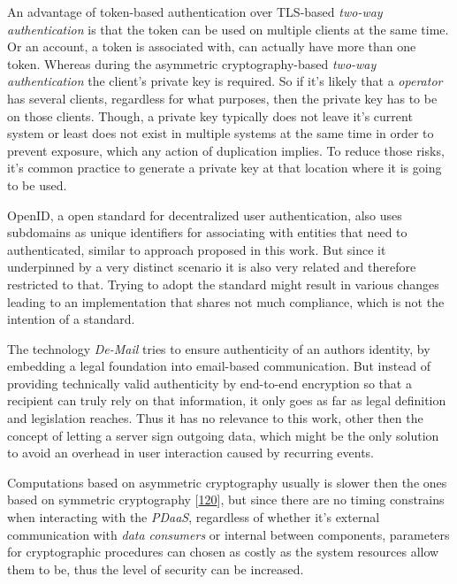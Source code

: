 \documentclass[12pt,english,a4paper,titlepage,cleardoublepage=empty,dottedtoc]{report}
\begin{document}
An advantage of token-based authentication over TLS-based \emph{two-way
authentication} is that the token can be used on multiple clients at the
same time. Or an account, a token is associated with, can actually have
more than one token. Whereas during the asymmetric cryptography-based
\emph{two-way authentication} the client's private key is required. So
if it's likely that a \emph{operator} has several clients, regardless
for what purposes, then the private key has to be on those clients.
Though, a private key typically does not leave it's current system or
least does not exist in multiple systems at the same time in order to
prevent exposure, which any action of duplication implies. To reduce
those risks, it's common practice to generate a private key at that
location where it is going to be used.

OpenID, a open standard for decentralized user authentication, also uses
subdomains as unique identifiers for associating with entities that need
to authenticated, similar to approach proposed in this work. But since
it underpinned by a very distinct scenario it is also very related and
therefore restricted to that. Trying to adopt the standard might result
in various changes leading to an implementation that shares not much
compliance, which is not the intention of a standard.

The technology \emph{De-Mail} tries to ensure authenticity of an authors
identity, by embedding a legal foundation into email-based
communication. But instead of providing technically valid authenticity
by end-to-end encryption so that a recipient can truly rely on that
information, it only goes as far as legal definition and legislation
reaches. Thus it has no relevance to this work, other then the concept
of letting a server sign outgoing data, which might be the only solution
to avoid an overhead in user interaction caused by recurring events.

Computations based on asymmetric cryptography usually is slower then the
ones based on symmetric cryptography
{[}\protect\hyperlink{ref-book_2014_chapter-10-5-asym-random-number-gen}{120}{]},
but since there are no timing constrains when interacting with the
\emph{PDaaS}, regardless of whether it's external communication with
\emph{data consumers} or internal between components, parameters for
cryptographic procedures can chosen as costly as the system resources
allow them to be, thus the level of security can be increased.
\end{document}
